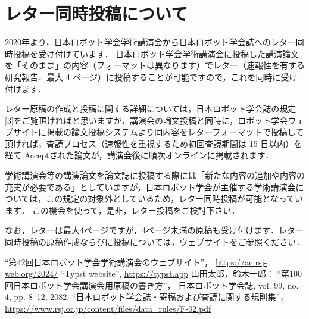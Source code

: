 \documentclass[twocolumn]{jarticle} %
\begin{document}
\section{レター同時投稿について}
2020年より，日本ロボット学会学術講演会から日本ロボット学会誌へのレター同時投稿を受け付けています．
日本ロボット学会学術講演会に投稿した講演論文を「そのまま」の内容（フォーマットは異なります）でレター（速報性を有する研究報告．最大 4 ページ）に投稿することが可能ですので，これを同時に受け付けます． 

レター原稿の作成と投稿に関する詳細については，日本ロボット学会誌の規定[3]をご覧頂ければと思いますが，講演会の論文投稿と同時に，ロボット学会ウェブサイトに掲載の論文投稿システムより同内容をレターフォーマットで投稿して頂ければ，査読プロセス（速報性を重視するため初回査読期間は 15 日以内）を経て Acceptされた論文が，講演会後に順次オンラインに掲載されます．

学術講演会等の講演論文を論文誌に投稿する際には「新たな内容の追加や内容の充実が必要である」としていますが，日本ロボット学会が主催する学術講演会については，この規定の対象外としているため，レター同時投稿が可能となっています．
この機会を使って，是非，レター投稿をご検討下さい．

なお，レターは最大4ページですが，4ページ未満の原稿も受け付けます．レター同時投稿の原稿作成ならびに投稿については，ウェブサイト\cite{website}をご参照ください．



\small
\begin{thebibliography}{9}

``第42回日本ロボット学会学術講演会のウェブサイト''，
  \url{https://ac.rsj-web.org/2024/}
  ``Typst website'',
  \url{https://typst.app}
  山田太郎，鈴木一郎：
  ``第100回日本ロボット学会講演会用原稿の書き方''，
  日本ロボット学会誌, vol. 99, no. 4, pp. 8--12, 2082.
  ``日本ロボット学会誌・寄稿および査読に関する規則集''，
  \url{https://www.rsj.or.jp/content/files/data_rules/F-02.pdf}
\end{thebibliography}
\end{document}
